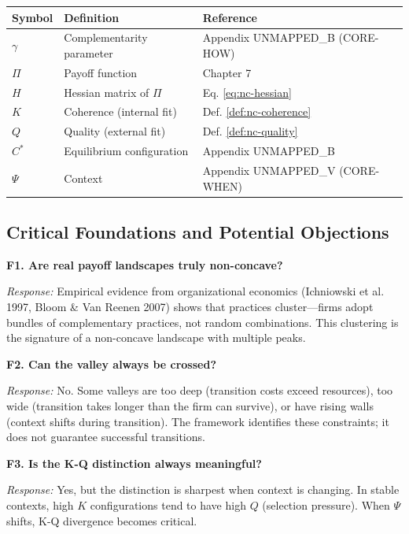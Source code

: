 \begin{center}
\renewcommand{\arraystretch}{1.3}
\begin{tabular}{lll}
\hline
\textbf{Symbol} & \textbf{Definition} & \textbf{Reference} \\
\hline
$\gamma$ & Complementarity parameter & Appendix UNMAPPED_B (CORE-HOW) \\
$\Pi$ & Payoff function & Chapter 7 \\
$H$ & Hessian matrix of $\Pi$ & Eq. \ref{eq:nc-hessian} \\
$K$ & Coherence (internal fit) & Def. \ref{def:nc-coherence} \\
$Q$ & Quality (external fit) & Def. \ref{def:nc-quality} \\
$C^*$ & Equilibrium configuration & Appendix UNMAPPED_B \\
$\Psi$ & Context & Appendix UNMAPPED_V (CORE-WHEN) \\
\hline
\end{tabular}
\end{center}


\subsection{Critical Foundations and Potential Objections}

\textbf{F1. Are real payoff landscapes truly non-concave?}

\textit{Response:} Empirical evidence from organizational economics (Ichniowski et al. 1997, Bloom \& Van Reenen 2007) shows that practices cluster---firms adopt bundles of complementary practices, not random combinations. This clustering is the signature of a non-concave landscape with multiple peaks.

\textbf{F2. Can the valley always be crossed?}

\textit{Response:} No. Some valleys are too deep (transition costs exceed resources), too wide (transition takes longer than the firm can survive), or have rising walls (context shifts during transition). The framework identifies these constraints; it does not guarantee successful transitions.

\textbf{F3. Is the K-Q distinction always meaningful?}

\textit{Response:} Yes, but the distinction is sharpest when context is changing. In stable contexts, high $K$ configurations tend to have high $Q$ (selection pressure). When $\Psi$ shifts, K-Q divergence becomes critical.

